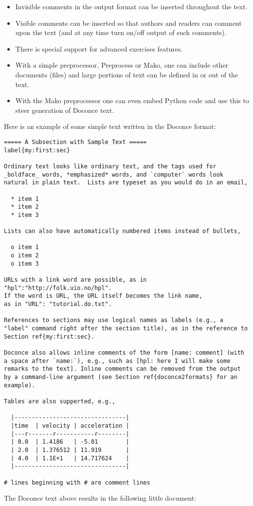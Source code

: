 \documentclass[%
oneside,                 %
final,                   %
10pt]{article}
\begin{document}
\begin{itemize}
  \item Invisible comments in the output format can be inserted throughout
    the text.

  \item Visible comments can be inserted so that authors and readers can
    comment upon the text (and at any time turn on/off output of such
    comments).

  \item There is special support for advanced exercises features.

  \item With a simple preprocessor, Preprocess or Mako, one can include
    other documents (files) and large portions of text can be defined
    in or out of the text.

  \item With the Mako preprocessor one can even embed Python
    code and use this to steer generation of Doconce text.
\end{itemize}

\noindent
Here is an example of some simple text written in the Doconce format:
\begin{Verbatim}[fontsize=\fontsize{9pt}{9pt},tabsize=8,baselinestretch=0.85,
fontfamily=tt,xleftmargin=7mm]
===== A Subsection with Sample Text =====
label{my:first:sec}

Ordinary text looks like ordinary text, and the tags used for
_boldface_ words, *emphasized* words, and `computer` words look
natural in plain text.  Lists are typeset as you would do in an email,

  * item 1
  * item 2
  * item 3

Lists can also have automatically numbered items instead of bullets,

  o item 1
  o item 2
  o item 3

URLs with a link word are possible, as in "hpl":"http://folk.uio.no/hpl".
If the word is URL, the URL itself becomes the link name,
as in "URL": "tutorial.do.txt".

References to sections may use logical names as labels (e.g., a
"label" command right after the section title), as in the reference to
Section ref{my:first:sec}.

Doconce also allows inline comments of the form [name: comment] (with
a space after `name:`), e.g., such as [hpl: here I will make some
remarks to the text]. Inline comments can be removed from the output
by a command-line argument (see Section ref{doconce2formats} for an
example).

Tables are also supperted, e.g.,

  |--------------------------------|
  |time  | velocity | acceleration |
  |---r-------r-----------r--------|
  | 0.0  | 1.4186   | -5.01        |
  | 2.0  | 1.376512 | 11.919       |
  | 4.0  | 1.1E+1   | 14.717624    |
  |--------------------------------|

# lines beginning with # are comment lines
\end{Verbatim}
\noindent
The Doconce text above results in the following little document:
\end{document}

